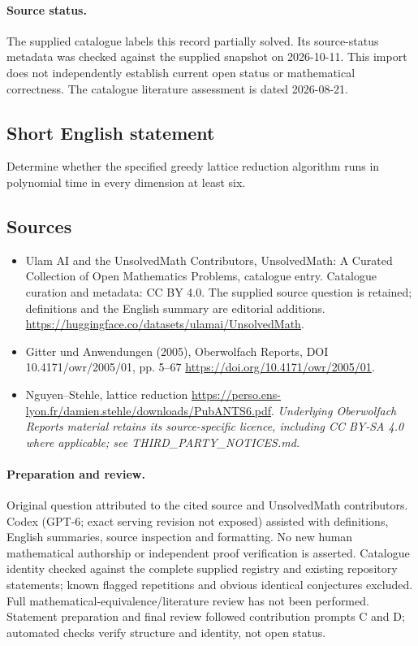 \documentclass[11pt]{article}
\begin{document}
\paragraph{Source status.}
The supplied catalogue labels this record partially solved. Its source-status metadata was checked against the supplied snapshot on 2026-10-11. This import does not independently establish current open status or mathematical correctness. The catalogue literature assessment is dated 2026-08-21.
\subsection{Short English statement}
Determine whether the specified greedy lattice reduction algorithm runs in polynomial time in every dimension at least six.
\subsection{Sources}
\begin{itemize}
\item[S1] Ulam AI and the UnsolvedMath Contributors, UnsolvedMath: A Curated Collection of Open Mathematics Problems, catalogue entry. Catalogue curation and metadata: CC BY 4.0. The supplied source question is retained; definitions and the English summary are editorial additions.
\url{https://huggingface.co/datasets/ulamai/UnsolvedMath}.
\item[S2] Gitter und Anwendungen (2005), Oberwolfach Reports, DOI 10.4171/owr/2005/01, pp. 5--67
\url{https://doi.org/10.4171/owr/2005/01}.
\item[S3] Nguyen--Stehle, lattice reduction
\url{https://perso.ens-lyon.fr/damien.stehle/downloads/PubANTS6.pdf}.
\textit{Underlying Oberwolfach Reports material retains its source-specific licence, including CC BY-SA 4.0 where applicable; see THIRD\_PARTY\_NOTICES.md.}
\end{itemize}
\paragraph{Preparation and review.}
Original question attributed to the cited source and UnsolvedMath contributors. Codex (GPT-6; exact serving revision not exposed) assisted with definitions, English summaries, source inspection and formatting. No new human mathematical authorship or independent proof verification is asserted. Catalogue identity checked against the complete supplied registry and existing repository statements; known flagged repetitions and obvious identical conjectures excluded. Full mathematical-equivalence/literature review has not been performed. Statement preparation and final review followed contribution prompts C and D; automated checks verify structure and identity, not open status.
\label{end:statement}
\end{document}
